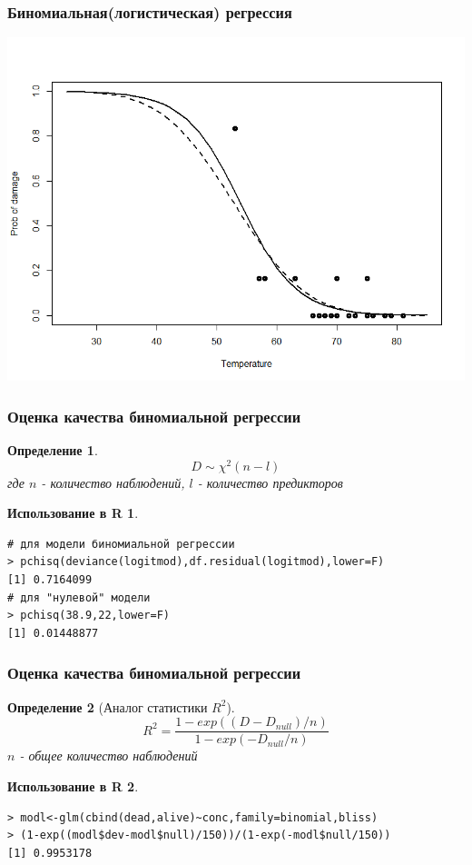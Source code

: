 \documentclass{beamer}
\newtheorem{defn}{Определение}
\newtheorem{exmpr}{Использование в R}
\begin{document}
\begin{frame}[containsverbatim]
\frametitle{Биномиальная(логистическая) регрессия}
\begin{center}
\includegraphics[width=1\textwidth,height=0.8\textheight]{logitplot1.png}
\end{center}
\end{frame}


\begin{frame}[containsverbatim]
\frametitle{Оценка качества биномиальной регрессии}
\begin{defn}
$$D\sim \chi^2(n-l)$$
где $n$ - количество наблюдений, $l$ - количество предикторов
\end{defn}
\begin{exmpr}
\begin{verbatim}
# для модели биномиальной регрессии
> pchisq(deviance(logitmod),df.residual(logitmod),lower=F)
[1] 0.7164099 
# для "нулевой" модели
> pchisq(38.9,22,lower=F)
[1] 0.01448877
\end{verbatim}
\end{exmpr}
\end{frame}


\begin{frame}[containsverbatim]
\frametitle{Оценка качества биномиальной регрессии}
\begin{defn}[Аналог статистики $R^2$]
$$R^2=\frac{1-exp((D-D_{null})/n)}{1-exp(-D_{null}/n)}$$
$n$ - общее количество наблюдений
\end{defn}
\begin{exmpr}
\begin{verbatim}
> modl<-glm(cbind(dead,alive)~conc,family=binomial,bliss)
> (1-exp((modl$dev-modl$null)/150))/(1-exp(-modl$null/150))
[1] 0.9953178
\end{verbatim}
\end{exmpr}
\end{frame}
\end{document}
